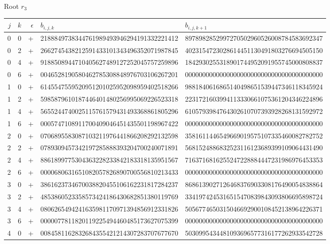 \par\medskip\normalfont\normalsize Root $r_3$\par\smallskip
\fontsize{7.6}{9.2}\selectfont\ttfamily
\begin{longtable}{rrrll}
$j$ & $k$ & $\epsilon$ & $b_{i,j,k}$ & $b_{i,j,k+1}$ \\ \hline\endhead
0 & 0 & + & 2188849738344761989493946294191332221412 & 8978982852997270502960526008784583692347 \\
0 & 2 & + & 2662745438212591433101343496352071987845 & 4023154723028614451130491803276694505150 \\
0 & 4 & + & 9188508944710405627489127252045757259896 & 1842930255318901744952091955745000808837 \\
0 & 6 & + & 0046528190580462785308848976703106267201 & 0000000000000000000000000000000000000000 \\
1 & 0 & + & 6145547559520951201025952098959402518266 & 9881840616865140498651539447346118345924 \\
1 & 2 & + & 5985879610187446401480256995069226523318 & 2231721603994113330661075361204346224896 \\
1 & 4 & + & 5655244740025115761579431493368861805296 & 6105793984764302610707393928268131592972 \\
1 & 6 & + & 0005747108911700409046451435501198967422 & 0000000000000000000000000000000000000000 \\
2 & 0 & + & 0706895583087103211976441866208292132598 & 3581611446549669019575107335460082782752 \\
2 & 2 & + & 0789309457342197285888393204700240071891 & 5681524886832523116123689399109064431490 \\
2 & 4 & + & 8861899775304363228233842183318135951567 & 7163716816255247228884447231986976453353 \\
2 & 6 & + & 0000680631651082057826890700556810213433 & 0000000000000000000000000000000000000000 \\
3 & 0 & + & 3861623734670038820455106162231817284237 & 8686139027126468376903308176490054838864 \\
3 & 2 & + & 4853860523358573424186430682851380119769 & 3341974245316515470839843093806695898724 \\
3 & 4 & + & 0806265494241635981170971394856912331826 & 5056774650315046692900108452138964226371 \\
3 & 6 & + & 0000077811820119225494460485173627075399 & 0000000000000000000000000000000000000000 \\
4 & 0 & + & 0084581162832684355421214307283707677670 & 5030995434481093696577316177262933542728 \\

\end{longtable}
